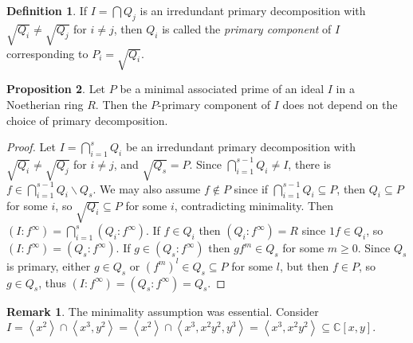 \documentclass[a4paper]{article}
\newcommand{\la}{\left\langle}
\newcommand{\ra}{\right\rangle}
\newcommand{\C}{\mathbb C}
\theoremstyle{definition}
\newtheorem{defn}{Definition}[subsection]
\newtheorem{prop}[defn]{Proposition}
\newtheorem*{remark}{Remark}
\begin{document}
\begin{defn}
If $I=\bigcap Q_j$ is an irredundant primary decomposition with $\sqrt{Q_i}\neq \sqrt{Q_j}$ for $i\neq j$, then $Q_i$ is called the \textit{primary component} of $I$ corresponding to $P_i=\sqrt{Q_i}$.
\end{defn}

\begin{prop}
Let $P$ be a minimal associated prime of an ideal $I$ in a Noetherian ring $R$. Then the $P$-primary component of $I$ does not depend on the choice of primary decomposition.
\end{prop}

\begin{proof}
Let $I=\bigcap_{i=1}^s Q_i$ be an irredundant primary decomposition with $\sqrt{Q_i}\neq\sqrt{Q_j}$ for $i\neq j$, and $\sqrt{Q_s}=P$. Since $\bigcap_{i=1}^{s-1} Q_i\neq I$, there is $f\in \bigcap_{i=1}^{s-1} Q_i\backslash Q_s$. We may also assume $f\notin P$ since if $\bigcap_{i=1}^{s-1} Q_i\subseteq P$, then $Q_i\subseteq P$ for some $i$, so $\sqrt{Q_i}\subseteq P$ for some $i$, contradicting minimality. Then $(I:f^\infty)=\bigcap_{i=1}^s (Q_i:f^\infty)$. If $f\in Q_i$ then $(Q_i:f^\infty)=R$ since $1f\in Q_i$, so $(I:f^\infty)=(Q_s:f^\infty)$. If $g\in(Q_s:f^\infty)$ then $gf^m\in Q_s$ for some $m\geq 0$. Since $Q_s$ is primary, either $g\in Q_s$ or $(f^m)^l\in Q_s\subseteq P$ for some $l$, but then $f\in P$, so $g\in Q_s$, thus $(I:f^\infty)=(Q_s:f^\infty)=Q_s$.
\end{proof}

\begin{remark}
The minimality assumption was essential. Consider $I=\la x^2\ra\cap\la x^3,y^2\ra=\la x^2\ra\cap \la x^3,x^2y^2,y^3\ra=\la x^3,x^2y^2\ra\subseteq \C[x,y]$.
\end{remark}
\end{document}
